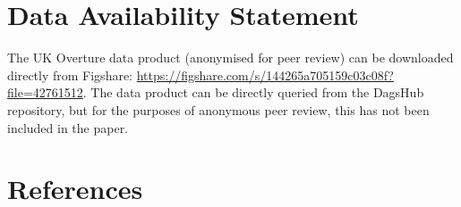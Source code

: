\documentclass[
]{article}
\begin{document}
\section{Data Availability Statement}\label{data-availability-statement}

The UK Overture data product (anonymised for peer review) can be
downloaded directly from Figshare:
\url{https://figshare.com/s/144265a705159c03c08f?file=42761512}. The
data product can be directly queried from the DagsHub repository, but
for the purposes of anonymous peer review, this has not been included in
the paper.

\section*{References}\label{references}
\end{document}
